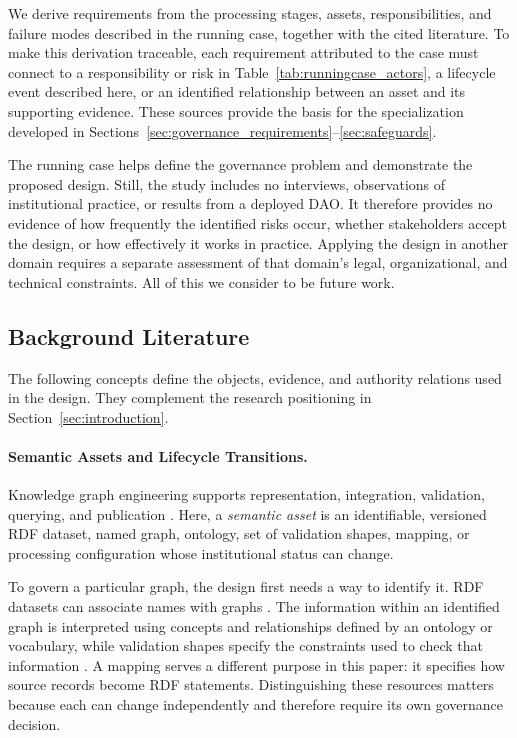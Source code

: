 \documentclass[journal]{IEEEtran}
\begin{document}
We derive requirements from the processing stages, assets,
responsibilities, and failure modes described in the running
case, together with the cited literature. To make this derivation
traceable, each requirement attributed to the case must connect
to a responsibility or risk in
Table~\ref{tab:runningcase_actors}, a lifecycle event described
here, or an identified relationship between an asset and its
supporting evidence. These sources provide the basis for the
specialization developed in
Sections~\ref{sec:governance_requirements}--\ref{sec:safeguards}.

The running case helps define the governance problem and
demonstrate the proposed design. Still, the study includes
no interviews, observations of institutional practice, or
results from a deployed DAO. It therefore provides no evidence
of how frequently the identified risks occur, whether
stakeholders accept the design, or how effectively it works
in practice. Applying the design in another domain requires
a separate assessment of that domain's legal, organizational,
and technical constraints. All of this we consider to be future work.

\subsection{Background Literature}
\label{sec:background}

The following concepts define the objects, evidence, and
authority relations used in the design. They complement the
research positioning in Section~\ref{sec:introduction}.

\paragraph{Semantic Assets and Lifecycle Transitions.}

Knowledge graph engineering supports representation, integration,
validation, querying, and publication
\cite{Hogan2021KnowledgeGraphs,Fensel2020KG}.
Here, a \emph{semantic asset} is an identifiable, versioned
RDF dataset, named graph, ontology, set of validation shapes,
mapping, or processing configuration whose institutional
status can change.

To govern a particular graph, the design first needs a way to identify
it. RDF datasets can associate names with graphs
\cite{Cyganiak2014RDFConcepts,Carroll2005NamedGraphs}. The information
within an identified graph is interpreted using concepts and
relationships defined by an ontology or vocabulary, while validation
shapes specify the constraints used to check that information
\cite{Knublauch2017SHACL}. A mapping serves a different purpose in
this paper: it specifies how source records become RDF statements.
Distinguishing these resources matters because each can change
independently and therefore require its own governance decision.
\end{document}
